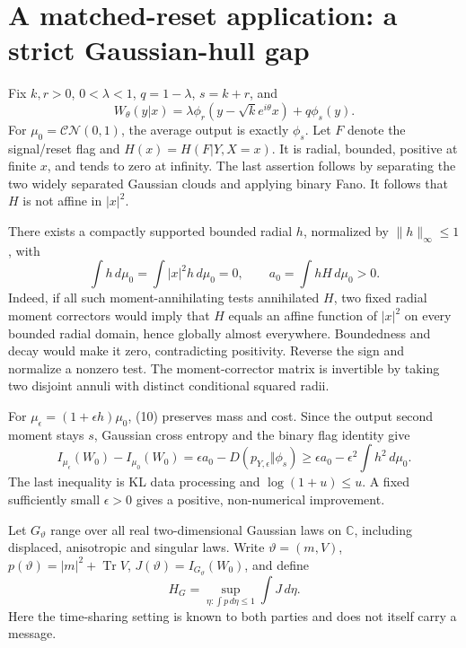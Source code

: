 \documentclass[11pt]{article}
\newcommand{\C}{\mathbb C}
\newcommand{\Tr}{\operatorname{Tr}}
\newcommand{\CN}{\mathcal{CN}}
\begin{document}
\section{A matched-reset application: a strict Gaussian-hull gap}

Fix \(k,r>0\), \(0<\lambda<1\), \(q=1-\lambda\), \(s=k+r\), and
\[
 W_\theta(y|x)=\lambda\phi_r(y-\sqrt k e^{i\theta}x)+q\phi_s(y).
\]
For \(\mu_0=\CN(0,1)\), the average output is exactly \(\phi_s\).
Let \(F\) denote the signal/reset flag and
\(H(x)=H(F|Y,X=x)\). It is radial, bounded, positive at finite \(x\),
and tends to zero at infinity. The last assertion follows by separating
the two widely separated Gaussian clouds and applying binary Fano.
It follows that \(H\) is not affine in \(|x|^2\).

There exists a compactly supported bounded radial \(h\), normalized by
\(\|h\|_\infty\leq1\), with
\[
 \int h\,d\mu_0=\int |x|^2h\,d\mu_0=0,\qquad
 a_0=\int hH\,d\mu_0>0.                                   \tag{10}
\]
Indeed, if all such moment-annihilating tests annihilated \(H\), two
fixed radial moment correctors would imply that \(H\) equals an affine
function of \(|x|^2\) on every bounded radial domain, hence globally
almost everywhere. Boundedness and decay would make it zero,
contradicting positivity. Reverse the sign and normalize a nonzero test.
The moment-corrector matrix is invertible by taking two disjoint annuli
with distinct conditional squared radii.

For \(\mu_\epsilon=(1+\epsilon h)\mu_0\), (10) preserves mass and cost.
Since the output second moment stays \(s\), Gaussian cross entropy and
the binary flag identity give
\[
 I_{\mu_\epsilon}(W_0)-I_{\mu_0}(W_0)
  =\epsilon a_0-D(p_{Y,\epsilon}\Vert\phi_s)
  \geq\epsilon a_0-\epsilon^2\int h^2\,d\mu_0.               \tag{11}
\]
The last inequality is KL data processing and
\(\log(1+u)\leq u\). A fixed sufficiently small \(\epsilon>0\)
gives a positive, non-numerical improvement.

Let \(G_\vartheta\) range over all real two-dimensional Gaussian laws
on \(\C\), including displaced, anisotropic and singular laws.
Write \(\vartheta=(m,V)\), \(p(\vartheta)=|m|^2+\Tr V\),
\(J(\vartheta)=I_{G_\vartheta}(W_0)\), and define
\[
 H_G=\sup_{\eta:\int p\,d\eta\leq1}\int J\,d\eta .           \tag{12}
\]
Here the time-sharing setting is known to both parties and does not
itself carry a message.
\end{document}
